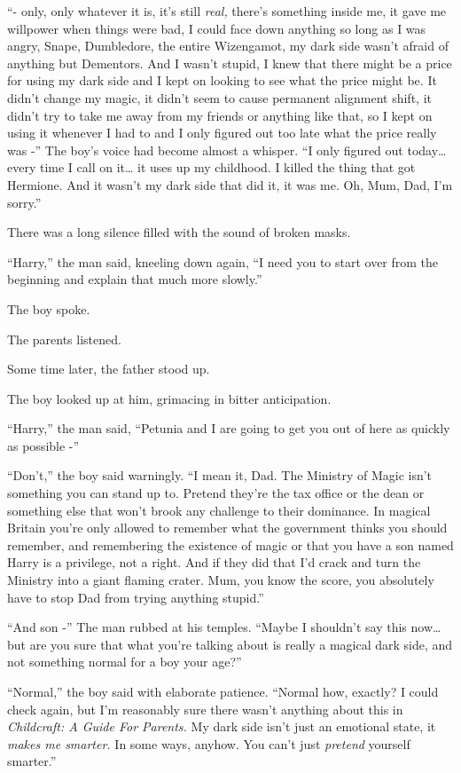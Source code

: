 ``- only, only whatever it is, it's still \emph{real,} there's something
inside me, it gave me willpower when things were bad, I could face down
anything so long as I was angry, Snape, Dumbledore, the entire
Wizengamot, my dark side wasn't afraid of anything but Dementors. And I
wasn't stupid, I knew that there might be a price for using my dark side
and I kept on looking to see what the price might be. It didn't change
my magic, it didn't seem to cause permanent alignment shift, it didn't
try to take me away from my friends or anything like that, so I kept on
using it whenever I had to and I only figured out too late what the
price really was -'' The boy's voice had become almost a whisper. ``I
only figured out today\ldots{} every time I call on it\ldots{} it uses
up my childhood. I killed the thing that got Hermione. And it wasn't my
dark side that did it, it was me. Oh, Mum, Dad, I'm sorry.''

There was a long silence filled with the sound of broken masks.

``Harry,'' the man said, kneeling down again, ``I need you to start over
from the beginning and explain that much more slowly.''

The boy spoke.

The parents listened.

Some time later, the father stood up.

The boy looked up at him, grimacing in bitter anticipation.

``Harry,'' the man said, ``Petunia and I are going to get you out of
here as quickly as possible -''

``Don't,'' the boy said warningly. ``I mean it, Dad. The Ministry of
Magic isn't something you can stand up to. Pretend they're the tax
office or the dean or something else that won't brook any challenge to
their dominance. In magical Britain you're only allowed to remember what
the government thinks you should remember, and remembering the existence
of magic or that you have a son named Harry is a privilege, not a right.
And if they did that I'd crack and turn the Ministry into a giant
flaming crater. Mum, you know the score, you absolutely have to stop Dad
from trying anything stupid.''

``And son -'' The man rubbed at his temples. ``Maybe I shouldn't say
this now\ldots{} but are you sure that what you're talking about is
really a magical dark side, and not something normal for a boy your
age?''

``Normal,'' the boy said with elaborate patience. ``Normal how, exactly?
I could check again, but I'm reasonably sure there wasn't anything about
this in \emph{Childcraft: A Guide For Parents.} My dark side isn't just
an emotional state, it \emph{makes me smarter.} In some ways, anyhow.
You can't just \emph{pretend} yourself smarter.''

